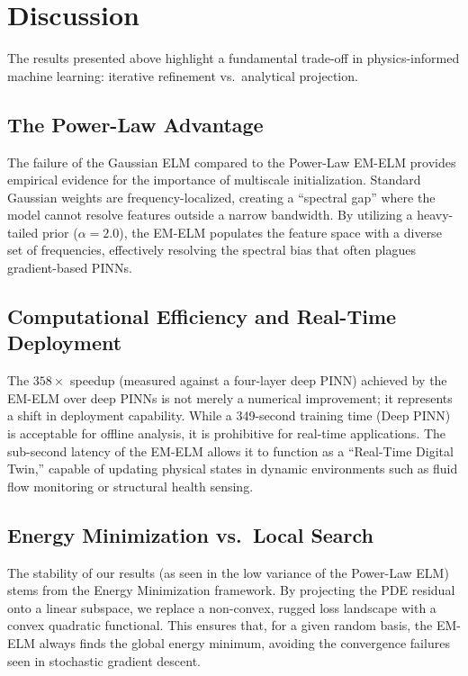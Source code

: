 \documentclass[final,12pt,3p,times,fleqn]{elsarticle}
\begin{document}
\section{Discussion}

The results presented above highlight a fundamental trade-off in physics-informed machine learning: iterative refinement vs.\ analytical projection.

\subsection{The Power-Law Advantage}

The failure of the Gaussian ELM compared to the Power-Law EM-ELM provides empirical evidence for the importance of multiscale initialization. Standard Gaussian weights are frequency-localized, creating a ``spectral gap'' where the model cannot resolve features outside a narrow bandwidth. By utilizing a heavy-tailed prior ($\alpha=2.0$), the EM-ELM populates the feature space with a diverse set of frequencies, effectively resolving the spectral bias that often plagues gradient-based PINNs.

\subsection{Computational Efficiency and Real-Time Deployment}

The $358\times$ speedup (measured against a four-layer deep PINN) achieved by the EM-ELM over deep PINNs is not merely a numerical improvement; it represents a shift in deployment capability. While a 349-second training time (Deep PINN) is acceptable for offline analysis, it is prohibitive for real-time applications. The sub-second latency of the EM-ELM allows it to function as a ``Real-Time Digital Twin,'' capable of updating physical states in dynamic environments such as fluid flow monitoring or structural health sensing.

\subsection{Energy Minimization vs.\ Local Search}

The stability of our results (as seen in the low variance of the Power-Law ELM) stems from the Energy Minimization framework. By projecting the PDE residual onto a linear subspace, we replace a non-convex, rugged loss landscape with a convex quadratic functional. This ensures that, for a given random basis, the EM-ELM always finds the global energy minimum, avoiding the convergence failures seen in stochastic gradient descent.
\end{document}
